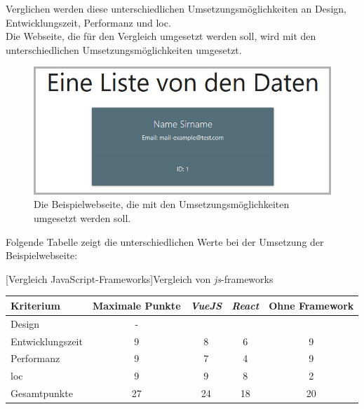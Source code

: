 Verglichen werden diese unterschiedlichen Umsetzungsmöglichkeiten an Design, Entwicklungszeit, Performanz und \Gls{loc}.\\
Die Webseite, die für den Vergleich umgesetzt werden soll, wird mit den unterschiedlichen Umsetzungsmöglichkeiten umgesetzt.\\
\begin{figure}[H]
	\centering
	\includegraphics[width=0.8\linewidth]{images/rfoster_study/example_page}
	\caption[Die Beispielwebseite]{Die Beispielwebseite, die mit den Umsetzungsmöglichkeiten umgesetzt werden soll.}
	\label{fig:example}
\end{figure}
Folgende Tabelle zeigt die unterschiedlichen Werte bei der Umsetzung der Beispielwebseite:
\begin{table}
	[Vergleich JavaScript-Frameworks]{Vergleich von \textit{\Gls{js}}-\Gls{framework}s}\label{tab:vergleich}
	\centering
	\label{center}
	\begin{tabular}{l|c|c|c|c}
		Kriterium        & Maximale Punkte & \textit{VueJS} & \textit{React} & Ohne Framework  \\\hline
		Design           & -                        &            \checkmark               &             \checkmark              &          \checkmark                           \\
		Entwicklungszeit & 9                         &             8              &               6            &               9                      \\
		Performanz       & 9                         &             7              &               4            &                 9                    \\
		\Gls{loc}              & 9                         &             9              &               8            &                   2                  \\
		Gesamtpunkte     & 27                         &              24             &               18            &                20                    
	\end{tabular}
\end{table}
